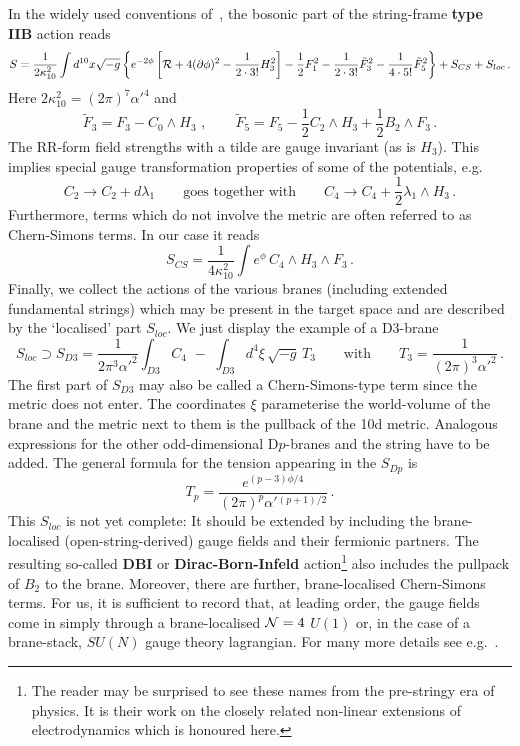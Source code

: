 \documentclass[12pt]{article}
\newcommand{\be}{\begin{equation}}
\newcommand{\ee}{\end{equation}}
\numberwithin{equation}{section}
\begin{document}
In the widely used conventions of~\cite{Polchinski:1998rq, Giddings:2001yu}, the bosonic part of the string-frame {\bf type IIB} action reads
\be
S=\frac{1}{2\kappa_{10}^2}\int d^{10}x\sqrt{-g}\left\{
e^{-2\phi}\left[{\cal R}+4(\partial\phi)^2-\frac{1}{2\cdot 3!}H_3^2\right]-\frac{1}{2}F_1^2-\frac{1}{2\cdot 3!}\tilde{F}_3^2-\frac{1}{4\cdot  5!}\tilde{F}_5^2\right\}+S_{CS}+S_{loc}\,.
\ee
Here $2\kappa_{10}^2=(2\pi)^7\alpha'^4$ and
\be
\tilde{F}_3=F_3-C_0\wedge H_3\,\,,\qquad \tilde{F}_5=F_5-\frac{1}{2}C_2\wedge H_3+\frac{1}{2}B_2\wedge F_3\,.
\ee
The RR-form field strengths with a tilde are gauge invariant (as is $H_3$). This implies special gauge transformation properties of some of the potentials, e.g.
\be
C_2\to C_2+d\lambda_1\qquad\mbox{goes together with}\qquad C_4\to C_4+\frac{1}{2}\lambda_1\wedge H_3\,.
\ee
Furthermore, terms which do not involve the metric are often referred to as Chern-Simons terms. In our case it reads
\be
S_{CS}=\frac{1}{4\kappa_{10}^2}\int e^\phi\,C_4\wedge H_3\wedge F_3\,.
\ee
Finally, we collect the actions of the various branes (including extended fundamental strings) which may be present in the target space and are described by the `localised' part $S_{loc}$. We just display the example of a D3-brane
\be
S_{loc}\supset S_{D3}=\frac{1}{2\pi^3\alpha'^2}\int_{D3}C_4\,\,-\,\,\int_{D3} d^4\xi\, \sqrt{-g}\,T_3\qquad\mbox{with}\qquad T_3=\frac{1}{(2\pi)^3\alpha'^2}\,.
\ee
The first part of $S_{D3}$ may also be called a Chern-Simons-type term since the metric does not enter. The coordinates $\xi$ parameterise the world-volume of the brane and the metric next to them is the pullback of the 10d metric. Analogous expressions for the other odd-dimensional D$p$-branes and the string have to be added. The general formula for the tension appearing in the $S_{Dp}$ is
\be
T_p=\frac{e^{(p-3)\phi/4}}{(2\pi)^p\alpha'{}^{(p+1)/2}}\,.
\ee
This $S_{loc}$ is not yet complete: It should be extended by including the brane-localised (open-string-derived) gauge fields and their fermionic partners. The resulting so-called {\bf DBI} or {\bf Dirac-Born-Infeld} action\footnote{
The reader may be surprised to see these names from the pre-stringy era of physics. It is their work on the closely related non-linear extensions of electrodynamics which is honoured here.
} 
also includes the pullpack of $B_2$ to the brane. Moreover, there are further, brane-localised Chern-Simons terms. For us, it is sufficient to record that, at leading order, the gauge fields come in simply through a brane-localised ${\cal N}=4$ $U(1)$ or, in the case of a brane-stack, $SU(N)$ gauge theory lagrangian. For many more details see e.g.~\cite{Johnson:2000ch, ortin}.
\end{document}
